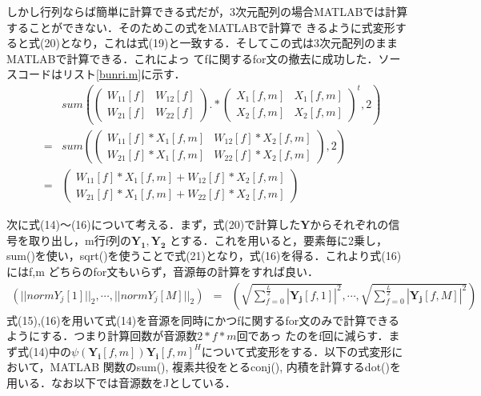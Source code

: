 \documentclass[a4j]{jarticle}
\begin{document}
しかし行列ならば簡単に計算できる式だが，3次元配列の場合MATLABでは計算することができない．そのためこの式をMATLABで計算で
きるように式変形すると式(20)となり，これは式(19)と一致する．そしてこの式は3次元配列のままMATLABで計算できる．これによっ
てfに関するfor文の撤去に成功した．ソースコードはリスト\ref{bunri.m}に示す．
\begin{eqnarray}
&& sum \left(
\left(
 \begin{array}{ccc}
  W_{11}[f] & W_{12}[f]\\
  W_{21}[f] & W_{22}[f]
 \end{array}
\right) 
.*
\left(
 \begin{array}{ccc}
  X_1[f,m] & X_1[f,m]\\
  X_2[f,m] & X_2[f,m]
 \end{array}
\right)^t
, 2\right) \\
&=& 
sum \left(
\left(
 \begin{array}{ccc}
  W_{11}[f] * X_1[f,m] & W_{12}[f] * X_2[f,m]\\
  W_{21}[f] * X_1[f,m] & W_{22}[f] * X_2[f,m]
 \end{array}
\right) 
, 2\right) \nonumber \\
&=& 
\left(
 \begin{array}{ccc}
  W_{11}[f] * X_1[f,m] + W_{12}[f] * X_2[f,m]\\
  W_{21}[f] * X_1[f,m] + W_{22}[f] * X_2[f,m]
 \end{array}
\right) \nonumber
\end{eqnarray}

次に式(14)〜(16)について考える．まず，式(20)で計算した$\bm{Y}$からそれぞれの信号を取り出し，m行f列の$\bm{Y_1}, \bm{Y_2}$
とする．これを用いると，要素毎に2乗し，sum()を使い，sqrt()を使うことで式(21)となり，式(16)を得る．これより式(16)にはf,m
どちらのfor文もいらず，音源毎の計算をすれば良い．
 \begin{eqnarray}
\left(||normY_j[1]||_2, \cdots , ||normY_j[M]||_2 \right) &=& \left(\sqrt{\sum_{f=0}^{\frac{L}{2}}
 |\bm{Y_j}[f,1]|^2}, \cdots , \sqrt{\sum_{f=0}^{\frac{L}{2}} |\bm{Y_j}[f,M]|^2} \right)  
 \end{eqnarray}
式(15),(16)を用いて式(14)を音源を同時にかつfに関するfor文のみで計算できるようにする．つまり計算回数が音源数$2*f*m$回であっ
たのをf回に減らす．まず式(14)中の$\psi (\bm{Y_i}[f,m])\bm{Y_i}[f,m]^H$について式変形をする．以下の式変形において，MATLAB
関数のsum(), 複素共役をとるconj(), 内積を計算するdot()を用いる．なお以下では音源数をJとしている．
\end{document}
